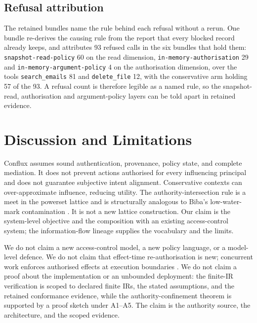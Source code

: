 \documentclass[11pt]{article}
\begin{document}
\subsection{Refusal attribution}

The retained bundles name the rule behind each refusal without a rerun. One
bundle re-derives the causing rule from the report that every blocked record
already keeps, and attributes 93 refused calls in the six bundles that hold
them: \texttt{snapshot-read-policy} 60 on the read dimension,
\texttt{in-memory-authorisation} 29 and \texttt{in-memory-argument-policy} 4
on the authorisation dimension, over the tools \texttt{search\_emails} 81 and
\texttt{delete\_file} 12, with the conservative arm holding 57 of the 93. A
refusal count is therefore legible as a named rule, so the snapshot-read,
authorisation and argument-policy layers can be told apart in retained
evidence.


\section{Discussion and Limitations}

Conflux assumes sound authentication, provenance, policy state, and complete
mediation. It does not prevent actions authorised for every influencing
principal and does not guarantee subjective intent alignment. Conservative
contexts can over-approximate influence, reducing utility. The
authority-intersection rule is a meet in the powerset lattice and is
structurally analogous to Biba's low-water-mark contamination
\citep{biba1977,denning1976}. It is not a new lattice construction. Our claim
is the system-level objective and the composition with an existing
access-control system; the information-flow lineage
\citep{sabelfeld2003,myersliskov,declassification-survey,robust-declassification,attacker-control,nonmalleable-ifc}
supplies the vocabulary and the limits.

We do not claim a new access-control model, a new policy language, or a
model-level defence. We do not claim that effect-time re-authorisation is new;
concurrent work enforces authorised effects at execution boundaries
\citep{zhu2026runtime,zheng2026apex}. We do not claim a proof about the
implementation or an unbounded deployment: the finite-IR verification is scoped
to declared finite IRs, the stated assumptions, and the retained conformance
evidence, while the authority-confinement theorem is supported by a proof
sketch under A1--A5. The claim is the authority source, the architecture, and the scoped
evidence.
\end{document}

